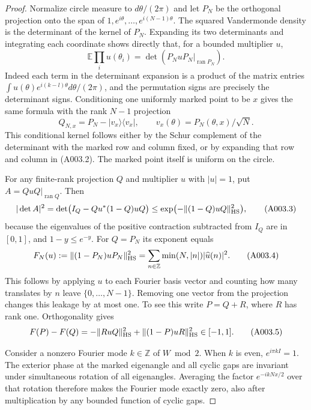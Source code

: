 \begin{proof}
Normalize circle measure to $d\theta/(2\pi)$ and let $P_N$ be the orthogonal
projection onto the span of $1,e^{i\theta},\ldots,e^{i(N-1)\theta}$.
The squared Vandermonde density is the determinant of the kernel of $P_N$.
Expanding its two determinants and integrating each coordinate shows directly
that, for a bounded multiplier $u$,
\[
 \mathbb E\prod_i u(\theta_i)
       =\det(P_NuP_N|_{\operatorname{ran}P_N}).       \tag{A003.2}
\]
Indeed each term in the determinant expansion is a product of the matrix
entries $\int u(\theta)e^{i(k-l)\theta}d\theta/(2\pi)$, and the permutation
signs are precisely the determinant signs.  Conditioning one uniformly
marked point to be $x$ gives the same formula with the rank $N-1$ projection
\[
 Q_{N,x}=P_N-|v_x\rangle\langle v_x|,
 \qquad v_x(\theta)=P_N(\theta,x)/\sqrt N.
\]
This conditional kernel follows either by the Schur complement of the
determinant with the marked row and column fixed, or by expanding that row
and column in (A003.2).  The marked point itself is uniform on the circle.

For any finite-rank projection $Q$ and multiplier $u$ with $|u|=1$, put
$A=QuQ|_{\operatorname{ran}Q}$.  Then
\[
 |\det A|^2=\det\bigl(I_Q-Qu^*(1-Q)uQ\bigr)
       \leq \exp\bigl(-\|(1-Q)uQ\|_{\rm HS}^2\bigr),       \tag{A003.3}
\]
because the eigenvalues of the positive contraction subtracted from $I_Q$
are in $[0,1]$, and $1-y\leq e^{-y}$.  For $Q=P_N$ its exponent equals
\[
 F_N(u):=\|(1-P_N)uP_N\|_{\rm HS}^2
       =\sum_{n\in\mathbb Z}\min(N,|n|)|\widehat u(n)|^2.   \tag{A003.4}
\]
This follows by applying $u$ to each Fourier basis vector and counting how
many translates by $n$ leave $\{0,\ldots,N-1\}$.  Removing one vector from
the projection changes this leakage by at most one.  To see this write
$P=Q+R$, where $R$ has rank one.  Orthogonality gives
\[
 F(P)-F(Q)=-\|RuQ\|_{\rm HS}^2+
                 \|(1-P)uR\|_{\rm HS}^2\in[-1,1].       \tag{A003.5}
\]

Consider a nonzero Fourier mode $k\in\mathbb Z$ of $W\bmod2$.
When $k$ is even, $e^{i\pi kI}=1$.  The exterior phase at the marked
eigenangle and all cyclic gaps are invariant under simultaneous rotation of
all eigenangles.  Averaging the factor $e^{-ikNx/2}$ over that rotation
therefore makes the Fourier mode exactly zero, also after multiplication
by any bounded function of cyclic gaps.


\end{proof}
